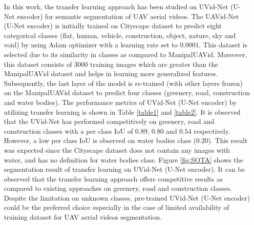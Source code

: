 \documentclass[journal]{IEEEtran}
\begin{document}
\par In this work, the transfer learning approach has been studied on UVid-Net (U-Net encoder) for semantic segmentation of UAV aerial videos. The UAVid-Net (U-Net encoder) is initially trained on Cityscape \cite{cordts2016cityscapes} dataset to predict eight categorical classes (flat, human, vehicle, construction, object, nature, sky and void) by using Adam optimizer with a learning rate set to $0.0001$. This dataset is selected due to its similarity in classes as compared to ManipalUAVid. Moreover, this dataset consists of 3000 training images which are greater than the ManipalUAVid dataset and helps in learning more generalized features. Subsequently, the last layer of the model is re-trained (with other layers frozen) on the ManipalUAVid dataset to predict four classes (greenery, road, construction and water bodies).  The performance metrics of UVid-Net (U-Net encoder) by utilizing transfer learning is shown in Table \ref{table1} and \ref{table2}. It is observed that the UVid-Net has performed competitively on greenery, road and construction classes with a per class IoU of $0.89$, $0.80$ and $0.54$ respectively. However, a low per class IoU is observed on water bodies class ($0.20$). This result was expected since the Cityscape dataset does not contain any images with water, and has no definition for water bodies class.  Figure \ref{fig:SOTA} shows the segmentation result of transfer learning on UVid-Net (U-Net encoder). It can be observed that the transfer learning approach offers competitive results as compared to existing approaches on greenery, road and construction classes.  Despite the limitation on unknown classes, pre-trained UVid-Net (U-Net encoder) could be the preferred choice especially in the case of limited availability of training dataset for UAV aerial videos segmentation.
\end{document}
